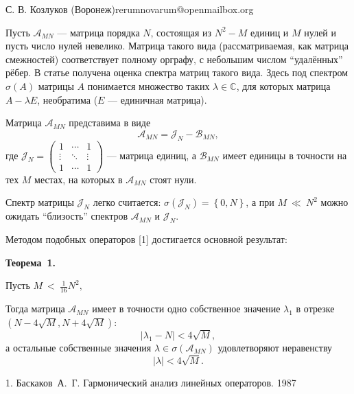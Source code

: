 \documentclass{article}
\begin{document}
{С. В. Козлуков}
{}{ (Воронеж)}{rerumnovarum@openmailbox.org}

Пусть \( \mathcal{A}_{MN} \) --- матрица порядка \( N \),
состоящая из \( N^2 - M \) единиц и \( M \) нулей
и пусть число нулей невелико.
Матрица такого вида (рассматриваемая, как матрица смежностей) соответствует
полному орграфу, с небольшим числом ``удалённых'' рёбер.
В статье получена оценка спектра
матриц такого вида.
Здесь под спектром \( \sigma\left({A}\right) \) матрицы \( A \)
понимается множество таких \( \lambda\in\mathbb{C} \), для которых
матрица \( A - \lambda E \), необратима (\( E \) --- единичная матрица).

Матрица \( \mathcal{A}_{MN} \) представима в виде
\[
    \mathcal{A}_{MN} = \mathcal{J}_{N} - \mathcal{B}_{MN},
    \]
где \(
\mathcal{J}_{N} =
\begin{pmatrix}1 & \cdots & 1 \\
\vdots & \ddots & \vdots \\
1 & \cdots & 1
\end{pmatrix} \) --- матрица единиц,
а \( \mathcal{B}_{MN} \) имеет единицы в точности на тех \( M \)
местах, на которых в \( \mathcal{A}_{MN} \) стоят нули.

Спектр матрицы \( \mathcal{J}_{N} \) легко считается:
\( \sigma\left({\mathcal{J}_{N}}\right) = \left\{0, N \right\} \),
а при \( M~\ll~N^2 \) можно ожидать ``близость'' спектров
\( \mathcal{A}_{MN} \) и \( \mathcal{J}_{N} \).

Методом подобных операторов [1]
достигается основной результат:

\textbf{Теорема~1.}
\begin{center}
    Пусть
    \(M~<~\frac{1}{16}N^2, \)

Тогда матрица \( \mathcal{A}_{MN} \) имеет в точности
одно собственное значение \( \lambda_1 \) в отрезке \( ( N-4\sqrt{M}, N+4\sqrt{M} ) \):
\[ \lvert \lambda_1 - N \rvert < 4\sqrt{M}, \]
    а остальные собственные значения \( \lambda\in\sigma\left({\mathcal{A}_{MN}}\right) \) удовлетворяют неравенству
\[ \lvert \lambda \rvert < 4\sqrt{M}. \]
\end{center}

\liter

1. Баскаков~А.~Г. Гармонический анализ линейных операторов. 1987
\end{document}
